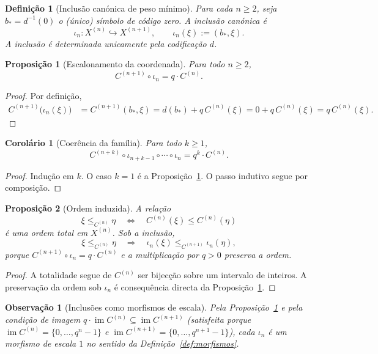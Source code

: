 \documentclass[11pt,a4paper]{article}
\newtheorem{definicao}{Definição}
\newtheorem{proposicao}{Proposição}
\newtheorem{observacao}{Observação}
\newtheorem{corolario}{Corolário}
\begin{document}
\begin{definicao}[Inclusão canónica de peso mínimo]
\label{def:iota}
Para cada \(n\ge 2\), seja \(b_*=d^{-1}(0)\) o (único) símbolo de código zero.
A inclusão canónica é
\[
\iota_n\colon X^{(n)}\hookrightarrow X^{(n+1)},
\qquad
\iota_n(\xi) := (b_*,\xi).
\]
A inclusão é determinada unicamente pela codificação \(d\).
\end{definicao}

\begin{proposicao}[Escalonamento da coordenada]
\label{prop:escalonamento}
Para todo \(n\ge 2\),
\[
C^{(n+1)}\circ\iota_n = q\cdot C^{(n)}.
\]
\end{proposicao}

\begin{proof}
Por definição,
\begin{align*}
C^{(n+1)}\bigl(\iota_n(\xi)\bigr)
&= C^{(n+1)}(b_*,\xi)
= d(b_*) + q\, C^{(n)}(\xi)
= 0 + q\, C^{(n)}(\xi)
= q\, C^{(n)}(\xi).
\end{align*}
\end{proof}

\begin{corolario}[Coerência da família]
\label{cor:coerencia}
Para todo \(k\ge 1\),
\[
C^{(n+k)}\circ\iota_{n+k-1}\circ\cdots\circ\iota_n = q^k\cdot C^{(n)}.
\]
\end{corolario}

\begin{proof}
Indução em \(k\). O caso \(k=1\) é a Proposição~\ref{prop:escalonamento}.
O passo indutivo segue por composição.
\end{proof}

\begin{proposicao}[Ordem induzida]
\label{prop:ordem}
A relação
\[
\xi\le_{C^{(n)}}\eta
\quad\Longleftrightarrow\quad
C^{(n)}(\xi)\le C^{(n)}(\eta)
\]
é uma ordem total em \(X^{(n)}\).
Sob a inclusão,
\[
\xi\le_{C^{(n)}}\eta
\quad\Longrightarrow\quad
\iota_n(\xi)\le_{C^{(n+1)}}\iota_n(\eta),
\]
porque \(C^{(n+1)}\circ\iota_n=q\cdot C^{(n)}\) e a multiplicação por \(q>0\)
preserva a ordem.
\end{proposicao}

\begin{proof}
A totalidade segue de \(C^{(n)}\) ser bijecção sobre um intervalo de inteiros.
A preservação da ordem sob \(\iota_n\) é consequência directa da
Proposição~\ref{prop:escalonamento}.
\end{proof}

\begin{observacao}[Inclusões como morfismos de escala]
\label{obs:iota-escala}
Pela Proposição~\ref{prop:escalonamento} e pela condição de imagem
\(q\cdot\operatorname{im} C^{(n)}\subseteq\operatorname{im} C^{(n+1)}\)
(satisfeita porque
\(\operatorname{im} C^{(n)}=\{0,\dots,q^n-1\}\) e
\(\operatorname{im} C^{(n+1)}=\{0,\dots,q^{n+1}-1\}\)),
cada \(\iota_n\) é um morfismo de escala \(1\) no sentido da
Definição~\ref{def:morfismos}.
\end{observacao}
\end{document}

